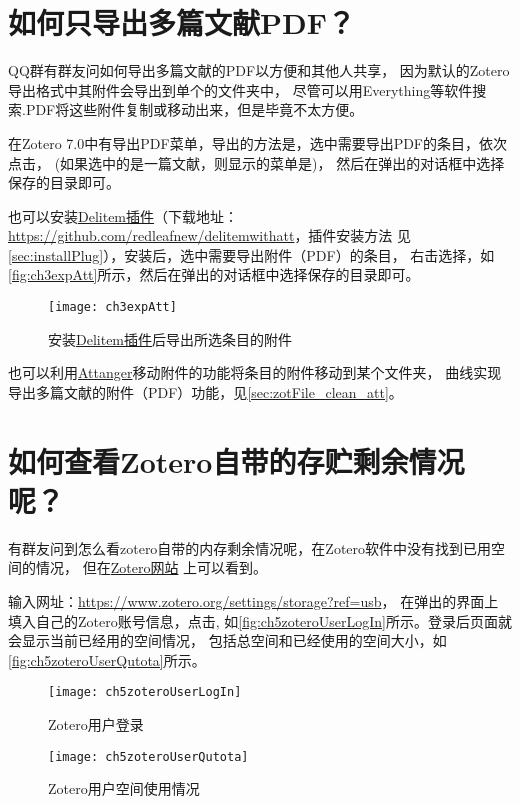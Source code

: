 \documentclass[theorem=false,mathfont=none,openany,sub3section]{easybook}
\begin{document}
\section{如何只导出多篇文献PDF？}\label{sec:zotFile_exp_pdf}

QQ群有群友问如何导出多篇文献的PDF以方便和其他人共享，
因为默认的Zotero 导出格式中其附件会导出到单个的文件夹中，
尽管可以用Everything等软件搜索.PDF将这些附件复制或移动出来，但是毕竟不太方便。

在Zotero 7.0中有导出PDF菜单，导出的方法是，选中需要导出PDF的条目，依次点击，
(如果选中的是一篇文献，则显示的菜单是)，
然后在弹出的对话框中选择保存的目录即可。

也可以安装\href{https://github.com/redleafnew/delitemwithatt}{Delitem插件}（下载地址：
\url{https://github.com/redleafnew/delitemwithatt}，插件安装方法
见\cref{sec:installPlug}），安装后，选中需要导出附件（PDF）的条目，
右击选择，如\autoref{fig:ch3expAtt}所示，然后在弹出的对话框中选择保存的目录即可。

	\begin{figure}[htbp]
		\centering
		\texttt{[image: ch3expAtt]}
		\caption{安装\href{https://github.com/redleafnew/delitemwithatt}{Delitem插件}后导出所选条目的附件}
		\label{fig:ch3expAtt}
	\end{figure}


也可以利用\href{https://github.com/MuiseDestiny/zotero-attanger}{Attanger}移动附件的功能将条目的附件移动到某个文件夹，
曲线实现导出多篇文献的附件（PDF）功能，见\cref{sec:zotFile_clean_att}。

\section{如何查看Zotero自带的存贮剩余情况呢？}\label{sec:Zotero_stor_limit}

有群友问到怎么看zotero自带的内存剩余情况呢，在Zotero软件中没有找到已用空间的情况，
但在\href{https://www.zotero.org/settings/storage?ref=usb}{Zotero网站} 上可以看到。

输入网址：\url{https://www.zotero.org/settings/storage?ref=usb}，
在弹出的界面上填入自己的Zotero账号信息，点击,
如\autoref{fig:ch5zoteroUserLogIn}所示。登录后页面就会显示当前已经用的空间情况，
包括总空间和已经使用的空间大小，如\autoref{fig:ch5zoteroUserQutota}所示。

	\begin{figure}[htbp]
		\centering
		\texttt{[image: ch5zoteroUserLogIn]}
		\caption{Zotero用户登录}
		\label{fig:ch5zoteroUserLogIn}
	\end{figure}
	\begin{figure}[htbp]
		\centering
		\texttt{[image: ch5zoteroUserQutota]}
		\caption{Zotero用户空间使用情况}
		\label{fig:ch5zoteroUserQutota}
	\end{figure}
\end{document}
